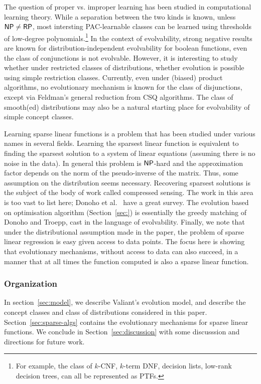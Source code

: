 The question of proper vs. improper learning has been studied in computational
learning theory. While a separation between the two kinds is known, unless $\mathsf{NP}
\neq \mathsf{RP}$, most intersting PAC-learnable classes can be learned using thresholds
of low-degree polynomials.\footnote{For example, the class of $k$-CNF, $k$-term
DNF, decision lists, low-rank decision trees, can all be represented as PTFs.}
In the context of evolvability, strong negative results are known for
distribution-independent evolvability for boolean functions, \eg even the class
of conjunctions is not evolvable. However, it is interesting to study whether
under restricted classes of distributions, whether evolution is possible using
simple restriction classes. Currently, even under (biased) product algorithms,
no evolutionary mechanism is known for the class of disjunctions, except via
Feldman's general reduction from CSQ algorithms. The class of smooth(ed)
distributions may also be a natural starting place for evolvability of simple
concept classes.


Learning sparse linear functions is a problem that has been studied under
various names in several fields. Learning the sparsest linear function is
equivalent to finding the sparsest solution to a system of linear equations
(assuming there is no noise in the data). In general this problem is $\mathsf{NP}$-hard
and the approximation factor depends on the norm of the pseudo-inverse of the
matrix\cite{Natarjan:1995}. Thus, some assumption on the distribution seems
necessary. Recovering sparsest solutions is the subject of the body of work
called compressed sensing. The work in this area is too vast to list here;
Donoho et al.~\cite{Donoho:} have a great survey. The evolution based on
optimisation algorithm (Section~\ref{sec:}) is essentially the greedy matching
of Donoho and Troepp, cast in the language of evolvability. Finally, we note
that under the distributional assumption made in the paper, the problem of
sparse linear regression is easy given access to data points. The focus here is
showing that evolutionary mechanisms, without access to data can also succeed,
in a manner that at all times the function computed is also a sparse linear
function.

\subsubsection*{Organization}

In section~\ref{sec:model}, we describe Valiant's evolution model, and describe
the concept classes and class of distributions considered in this paper.
Section~\ref{sec:sparse-algs} contains the evolutionary mechanisms for sparse
linear functions. We conclude in Section~\ref{sec:discussion} with some
discusssion and directions for future work.
